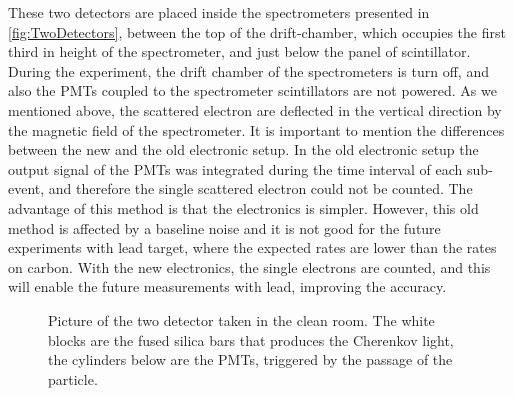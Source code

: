These two detectors are placed inside the spectrometers presented in \ref{fig:TwoDetectors}, between the top of the drift-chamber, which occupies the first third in height of the spectrometer, and just below the panel of scintillator. During the experiment, the drift chamber of the spectrometers is turn off, and also the PMTs coupled to the spectrometer scintillators are not powered.
As we mentioned above, the scattered electron are deflected in the vertical direction by the magnetic field of the spectrometer. It is important to mention the differences between the new and the old electronic setup. In the old electronic setup the output signal of the PMTs was integrated during the time interval of each sub-event, and therefore the single scattered electron could not be counted. The advantage of this method is that the electronics is simpler. However, this old method is affected by a baseline noise and it is not good for the future experiments with lead target, where the expected rates are lower than the rates on carbon.
With the new electronics, the single electrons are counted, and this will enable the future measurements with lead, improving the accuracy. 

\begin{figure}[hbtp]
\centering
{} \quad
{} \quad
	\label{fig:Detectors}
\caption{Picture of the two detector taken in the clean room. The white blocks are the fused silica bars that produces the Cherenkov light, the cylinders below are the PMTs, triggered by the passage of the particle. }
\end{figure}

